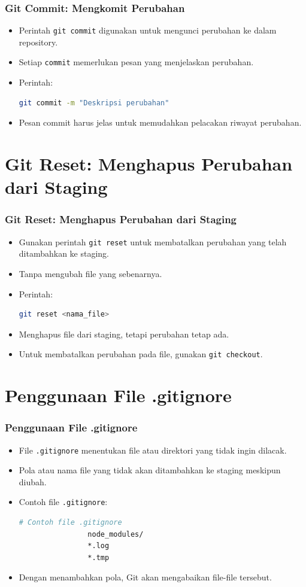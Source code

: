 \documentclass[aspectratio=169, table]{beamer}
\begin{document}
	\begin{frame}[fragile]
		\frametitle{Git Commit: Mengkomit Perubahan}
		\begin{itemize}
			\item Perintah \texttt{git commit} digunakan untuk mengunci perubahan ke dalam repository.
			\item Setiap \texttt{commit} memerlukan pesan yang menjelaskan perubahan.
			\item Perintah:
			\begin{lstlisting}[language=bash]
				git commit -m "Deskripsi perubahan"
			\end{lstlisting}
			\item Pesan commit harus jelas untuk memudahkan pelacakan riwayat perubahan.
		\end{itemize}
	\end{frame}
	
	\section{Git Reset: Menghapus Perubahan dari Staging}
	\begin{frame}[fragile]
		\frametitle{Git Reset: Menghapus Perubahan dari Staging}
		\begin{itemize}
			\item Gunakan perintah \texttt{git reset} untuk membatalkan perubahan yang telah ditambahkan ke staging.
			\item Tanpa mengubah file yang sebenarnya.
			\item Perintah:
			\begin{lstlisting}[language=bash]
				git reset <nama_file>
			\end{lstlisting}
			\item Menghapus file dari staging, tetapi perubahan tetap ada.
			\item Untuk membatalkan perubahan pada file, gunakan \texttt{git checkout}.
		\end{itemize}
	\end{frame}
	
	\section{Penggunaan File .gitignore}
	
	\begin{frame}[fragile]
		\frametitle{Penggunaan File .gitignore}
		\begin{itemize}
			\item File \texttt{.gitignore} menentukan file atau direktori yang tidak ingin dilacak.
			\item Pola atau nama file yang tidak akan ditambahkan ke staging meskipun diubah.
			\item Contoh file \texttt{.gitignore}:
			\begin{lstlisting}[language=bash]
				# Contoh file .gitignore
				node_modules/
				*.log
				*.tmp
			\end{lstlisting}
			\item Dengan menambahkan pola, Git akan mengabaikan file-file tersebut.
		\end{itemize}
	\end{frame}
	
\end{document}
